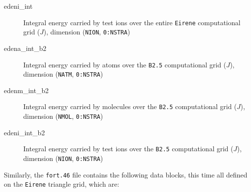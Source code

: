 \documentclass[a4paper,10pt]{report}
\begin{document}
\begin{description}
  \item[edeni\_int] Integral energy carried by test ions over the entire {\tt Eirene} computational grid ($J$), dimension ({\tt NION}, {\tt 0:NSTRA})
  \item[edena\_int\_b2] Integral energy carried by atoms over the {\tt B2.5} computational grid ($J$), dimension ({\tt NATM}, {\tt 0:NSTRA})
  \item[edenm\_int\_b2] Integral energy carried by molecules over the {\tt B2.5} computational grid ($J$), dimension ({\tt NMOL}, {\tt 0:NSTRA})
  \item[edeni\_int\_b2] Integral energy carried by test ions over the {\tt B2.5} computational grid ($J$), dimension ({\tt NION}, {\tt 0:NSTRA})
\end{description}

Similarly, the {\tt fort.46} file contains the following data blocks, this time all defined on the {\tt Eirene} triangle grid, which are:
\end{document}
